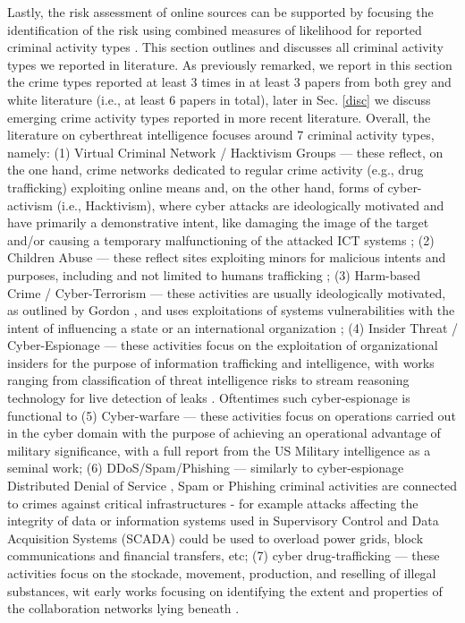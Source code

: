 Lastly, the risk assessment of online sources can be supported by focusing the identification of the risk using combined measures of likelihood for reported criminal activity types \cite{Elstob74}. This section outlines and discusses all criminal activity types we reported in literature. As previously remarked, we report in this section the crime types reported at least 3 times in at least 3 papers from both grey and white literature (i.e., at least 6 papers in total), later in Sec. \ref{disc} we discuss emerging crime activity types reported in more recent literature. Overall, the literature on cyberthreat intelligence focuses around 7 criminal activity types, namely: (1) Virtual Criminal Network / Hacktivism Groups --- these reflect, on the one hand, crime networks dedicated to regular crime activity (e.g., drug trafficking) exploiting online means \cite{HanWCMZ17} and, on the other hand, forms of cyber-activism (i.e., Hacktivism), where cyber attacks are ideologically motivated and have primarily a demonstrative intent, like damaging the image of the target and/or causing a temporary malfunctioning of the attacked ICT systems \cite{sureka2010mining}; (2) Children Abuse --- these reflect sites exploiting minors for malicious intents and purposes, including and not limited to humans trafficking \cite{HanWCMZ17}; (3) Harm-based Crime / Cyber-Terrorism --- these activities are usually ideologically motivated, as outlined by Gordon \cite{GordonF02}, and uses exploitations of systems vulnerabilities with the intent of influencing a state or an international organization \cite{VeerasamyG15};  (4) Insider Threat / Cyber-Espionage --- these activities focus on the exploitation of organizational insiders \cite{Rocha15a} for the purpose of information trafficking and intelligence, with works ranging from classification of threat intelligence risks \cite{SantosNYKLWOJC12} to stream reasoning technology for live detection of leaks \cite{ParveenMWETHK13}. Oftentimes such cyber-espionage is functional to (5) Cyber-warfare --- these activities focus on operations carried out in the cyber domain with the purpose of achieving an operational advantage of military significance, with a full report from the US Military intelligence \cite{Cordesman2002} as a seminal work; (6) DDoS/Spam/Phishing --- similarly to cyber-espionage Distributed Denial of Service \cite{Kandula05}, Spam or Phishing criminal activities are connected to crimes against critical infrastructures \cite{setola2016critical} - for example attacks affecting the integrity of data or information systems used in Supervisory Control and Data Acquisition Systems (SCADA) could be used to overload power grids, block communications and financial transfers, etc; (7) cyber drug-trafficking --- these activities focus on the stockade, movement, production, and reselling of illegal substances, wit early works focusing on identifying the extent and properties of the collaboration networks lying beneath \cite{Wood17}.

